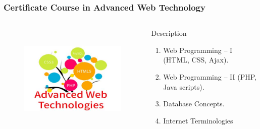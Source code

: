 \begin{frame}
	\frametitle{Certificate Course in Advanced Web Technology}
	\begin{columns}
	
	\begin{figure}
		\includegraphics[width=200pt,height=150pt]{figures/course_awt.jpg}
	\end{figure}
	
	
	\begin{block}{Description}
		
		\begin{enumerate}
			\item Web Programming – I (HTML, CSS, Ajax). 
			\item Web Programming – II (PHP, Java scripts).
			\item Database Concepts.
			\item Internet Terminologies
		\end{enumerate}
		
	\end{block}
	
\end{columns}
\end{frame}

